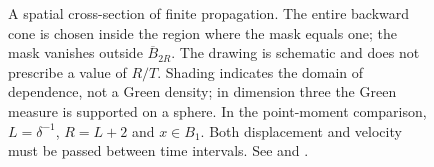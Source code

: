 \begin{figure}
  \centering
  
  \caption[Finite propagation and spatial cutoffs]{A spatial cross-section of
    finite propagation. The entire backward cone is chosen inside the region
    where the mask equals one; the mask vanishes outside $\overline{B}_{2R}$.
    The drawing is schematic and does not prescribe a value of $R/T$. Shading
    indicates the domain of dependence, not a Green density; in dimension three
    the Green measure is supported on a sphere. In the point-moment comparison,
    $L=\delta^{-1}$, $R=L+2$ and $x\in B_1$. Both displacement and velocity must
    be passed between time intervals. See 
    and .}
  \label{Fig:light-cone}
\end{figure}
